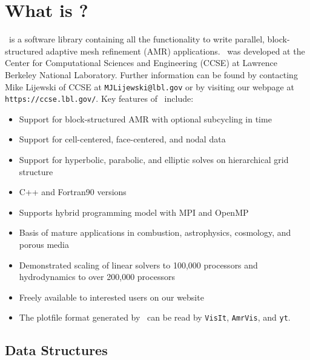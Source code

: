 \section{What is \BoxLib?}

\BoxLib\ is a software library containing all the functionality to write parallel, 
block-structured adaptive mesh refinement (AMR) applications.  \BoxLib\ was developed 
at the Center for Computational Sciences and Engineering (CCSE) at Lawrence Berkeley 
National Laboratory.  Further information can be found by contacting Mike Lijewski 
of CCSE at {\tt MJLijewski@lbl.gov} or by visiting our webpage
at {\tt https://ccse.lbl.gov/}.  Key features of \BoxLib\ include:

\begin{itemize}
\item Support for block-structured AMR with optional subcycling in time
\item Support for cell-centered, face-centered, and nodal data
\item Support for hyperbolic, parabolic, and elliptic solves on hierarchical grid structure
\item C++ and Fortran90 versions
\item Supports hybrid programming model with MPI and OpenMP
\item Basis of mature applications in combustion, astrophysics, cosmology, and porous media
\item Demonstrated scaling of linear solvers to 100,000 processors and 
      hydrodynamics to over 200,000 processors
\item Freely available to interested users on our website
\item The plotfile format generated by \BoxLib\ can be read by {\tt VisIt}, {\tt AmrVis},
      and {\tt yt}.
\end{itemize}

\subsection{Data Structures}

